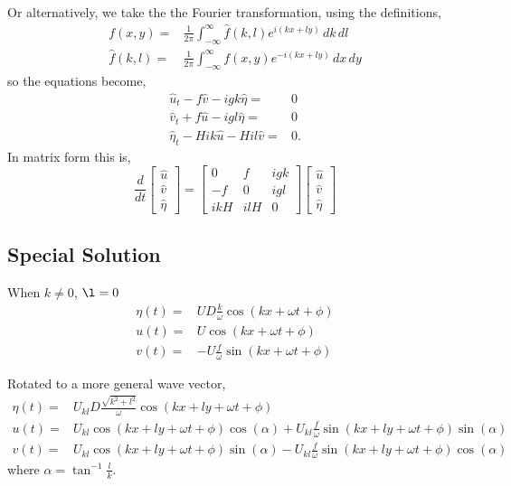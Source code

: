 \documentclass[11pt]{amsart}
\begin{document}
Or alternatively, we take the the Fourier transformation, using the definitions,
\begin{align}
f(x,y)=& \frac{1}{2\pi} \int_{-\infty}^{\infty} \hat{f}(k,l) e^{i(kx+ly)} \, dk\, dl \\
\hat{f}(k,l)=& \frac{1}{2\pi} \int_{-\infty}^{\infty} f(x,y) e^{-i(kx+ly)} \, dx\, dy
\end{align}
so the equations become,
\begin{align}
\hat{u}_t  -f \hat{v} - i g k \hat{\eta} =& 0 \\
\hat{v}_t + f \hat{u} - i g l \hat{\eta} =& 0 \\
\hat{\eta}_t - H i k \hat{u} - H i l \hat{v} =&0.
\end{align}
In matrix form this is,
\begin{equation}
\frac{d}{dt} \left[\begin{array}{c} \hat{u} \\ \hat{v} \\ \hat{\eta} \end{array}\right]
= \left[\begin{array}{ccc}0 & f & igk \\-f & 0 & igl \\ ikH & ilH & 0\end{array}\right]
\left[\begin{array}{c} \hat{u} \\ \hat{v} \\ \hat{\eta} \end{array}\right]
\end{equation}

%
\subsection{Special Solution}
%
When $k\neq0$, $\l=0$
\begin{align}
\eta(t) =& U D \frac{k}{\omega} \cos( kx + \omega t + \phi) \\
u(t) =& U\cos( kx + \omega t + \phi) \\
v(t) =& - U \frac{f}{\omega} \sin( kx + \omega t + \phi)
\end{align}

Rotated to a more general wave vector,
\begin{align}
\eta(t) =& U_{kl} D \frac{\sqrt{k^2+l^2}}{\omega} \cos( kx + ly + \omega t + \phi) \\
u(t) =& U_{kl} \cos( kx + ly + \omega t + \phi) \cos( \alpha) + U_{kl} \frac{f}{\omega} \sin( kx + ly + \omega t + \phi) \sin(\alpha) \\
v(t) =& U_{kl} \cos( kx + ly + \omega t + \phi) \sin(\alpha) - U_{kl} \frac{f}{\omega} \sin( kx + ly + \omega t + \phi) \cos( \alpha) 
\end{align}
where $\alpha = \tan^{-1} \frac{l}{k}$.
\end{document}
